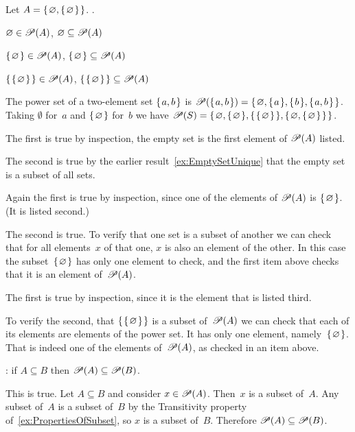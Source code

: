 \documentclass{test}  %
\begin{document}
\begin{ex}  Let $A=\mbox{$\{\hspace{0.1em}\varnothing,\mbox{$\{\hspace{0.1em}\varnothing\hspace{0.1em}\}$}\hspace{0.1em}\}$}$. \pord.
\begin{exes}
\item $\varnothing\in\mathscr{P}(A)$, 
  $\varnothing\subseteq\mathscr{P}(A)$    
\item $\mbox{$\{\hspace{0.1em}\varnothing\hspace{0.1em}\}$}\in\mathscr{P}(A)$, 
  $\mbox{$\{\hspace{0.1em}\varnothing\hspace{0.1em}\}$}\subseteq\mathscr{P}(A)$    
\item $\mbox{$\{\hspace{0.1em}\mbox{$\{\hspace{0.1em}\varnothing\hspace{0.1em}\}$}\hspace{0.1em}\}$}\in\mathscr{P}(A)$,    
  $\mbox{$\{\hspace{0.1em}\mbox{$\{\hspace{0.1em}\varnothing\hspace{0.1em}\}$}\hspace{0.1em}\}$}\subseteq\mathscr{P}(A)$    
\end{exes}
\begin{ans}
The power set of a two-element set $\mbox{$\{\hspace{0.1em}a,b\hspace{0.1em}\}$}$ is 
$\mathscr{P}(\mbox{$\{\hspace{0.1em}a,b\hspace{0.1em}\}$})=\mbox{$\{\hspace{0.1em}\varnothing,\mbox{$\{\hspace{0.1em}a\hspace{0.1em}\}$},\mbox{$\{\hspace{0.1em}b\hspace{0.1em}\}$},\mbox{$\{\hspace{0.1em}a,b\hspace{0.1em}\}$}\hspace{0.1em}\}$}$.
Taking $\emptyset$ for~$a$ and $\mbox{$\{\hspace{0.1em}\varnothing\hspace{0.1em}\}$}$ for~$b$ we have
$\mathscr{P}(S)=\mbox{$\{\hspace{0.1em}\varnothing, \mbox{$\{\hspace{0.1em}\varnothing\hspace{0.1em}\}$}, \mbox{$\{\hspace{0.1em}\mbox{$\{\hspace{0.1em}\varnothing\hspace{0.1em}\}$}\hspace{0.1em}\}$}, 
                   \mbox{$\{\hspace{0.1em}\varnothing, \mbox{$\{\hspace{0.1em}\varnothing\hspace{0.1em}\}$}\hspace{0.1em}\}$}\hspace{0.1em}\}$}$.
\begin{exes}
\item The first is true by inspection, the empty set is the first element
  of $\mathscr{P}(A)$ listed.

  The second is true by the earlier result~\ref{ex:EmptySetUnique}
  that the empty set is a subset of all sets.
\item Again the first is true by inspection, 
  since one of the elements of $\mathscr{P}(A)$ is 
  $\mbox{$\{\hspace{0.1em}\varnothing\hspace{0.1em}\}$}$.  (It is listed second.)

  The second is true.
  To verify that one set is a subset of another we can check that for all
  elements~$x$ of that one, $x$ is also an element of the other.
  In this case the subset~$\mbox{$\{\hspace{0.1em}\varnothing\hspace{0.1em}\}$}$ has only one element to check,
  and the first item above checks that it is an element of~$\mathscr{P}(A)$.
\item The first is true by inspection, since it is the element that is listed
  third.

  To verify the second,
  that $\mbox{$\{\hspace{0.1em}\mbox{$\{\hspace{0.1em}\varnothing\hspace{0.1em}\}$}\hspace{0.1em}\}$}$ is a subset of~$\mathscr{P}(A)$
  we can check that each of its elements are elements of the power set.
  It has only one element, namely~$\mbox{$\{\hspace{0.1em}\varnothing\hspace{0.1em}\}$}$.
  That is indeed one of the elements of~$\mathscr{P}(A)$, as checked in 
  an item above. 
\end{exes}
\end{ans}
\end{ex}

\begin{ex} \pord:
if $A\subseteq B$ then $\mathscr{P}(A)\subseteq\mathscr{P}(B)$.  
\begin{ans}
This is true.
Let $A\subseteq B$ and consider $x\in\mathscr{P}(A)$.
Then~$x$ is a subset of~$A$.
Any subset of~$A$ is a subset of~$B$ by 
the Transitivity property of~\ref{ex:PropertiesOfSubset},
so $x$ is a subset of~$B$.
Therefore $\mathscr{P}(A)\subseteq\mathscr{P}(B)$.
\end{ans}
\end{ex}
\end{document}

